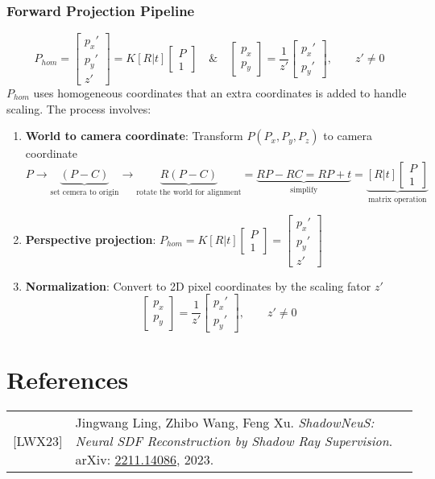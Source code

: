 \documentclass[12pt]{article}
\begin{document}
\subsubsection*{Forward Projection Pipeline}
\[
P_{hom} = \begin{bmatrix} p_x' \\ p_y' \\ z' \end{bmatrix} = K[R|t]\begin{bmatrix} P \\ 1 \end{bmatrix} \quad \& \quad \begin{bmatrix} p_x \\ p_y \end{bmatrix} = \frac{1}{z'}\begin{bmatrix} p_x' \\ p_y' \end{bmatrix}, \qquad z' \neq 0
\]
$P_{hom}$ uses homogeneous coordinates that an extra coordinates is added to handle scaling. The process involves:
\begin{enumerate}
    \item \textbf{World to camera coordinate}: Transform $P(P_x,P_y,P_z)$ to camera coordinate
    \[
        P \to \underbrace{(P-C)}_{\text{set cemera to origin}} \to \underbrace{R(P-C)}_{\text{rotate the world for alignment}} = \underbrace{RP-RC = RP+t}_{\text{simplify}} =\underbrace{ [R|t]\begin{bmatrix} P \\ 1 \end{bmatrix}}_{\text{matrix operation}}
    \]
    \item \textbf{Perspective projection}: \(P_{hom} = K[R|t]\begin{bmatrix} P \\ 1 \end{bmatrix} = \begin{bmatrix} p_x' \\ p_y' \\ z' \end{bmatrix}\)
    \item \textbf{Normalization}: Convert to 2D pixel coordinates by the scaling fator $z'$ \\
    \[
    \begin{bmatrix} p_x \\ p_y \end{bmatrix} = \frac{1}{z'}\begin{bmatrix} p_x' \\ p_y' \end{bmatrix}, \qquad z' \neq 0
    \]
\end{enumerate}


\newpage
\section*{References}
\begin{tabular}{@{}p{} p{}}
{[LWX23]} & Jingwang Ling, Zhibo Wang, Feng Xu. \textit{ShadowNeuS: Neural SDF Reconstruction by Shadow Ray Supervision}. arXiv: \href{https://arxiv.org/abs/2211.14086}{2211.14086}, 2023.
\end{tabular}
\end{document}
